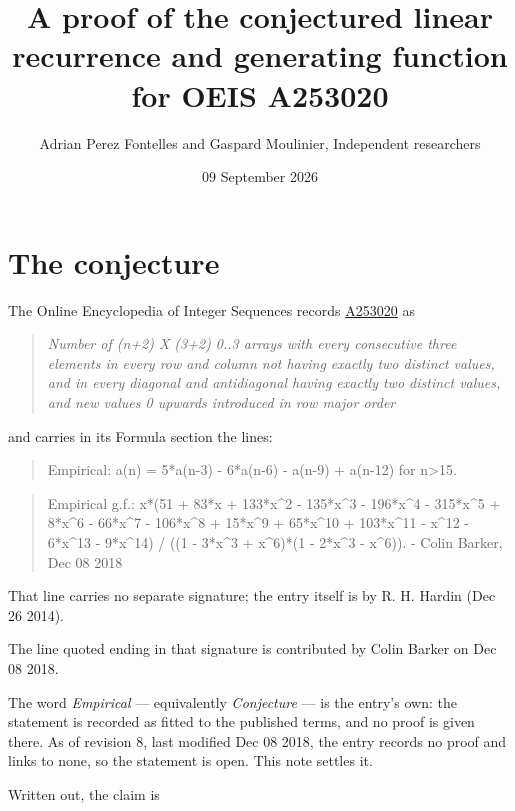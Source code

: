 \documentclass[11pt]{article}
\title{A proof of the conjectured linear recurrence and generating function for OEIS A253020}
\author{Adrian Perez Fontelles and Gaspard Moulinier, Independent researchers}
\date{09 September 2026}
\theoremstyle{definition}
\begin{document}
\maketitle
\section{The conjecture}

The Online Encyclopedia of Integer Sequences records \href{https://oeis.org/A253020}{A253020} as

\begin{quote}\itshape Number of (n+2) X (3+2) 0..3 arrays with every consecutive three elements in every row and column not having exactly two distinct values, and in every diagonal and antidiagonal having exactly two distinct values, and new values 0 upwards introduced in row major order\end{quote}

and carries in its Formula section the lines:

\begin{quote}\ttfamily Empirical: a(n) = 5*a(n-3) - 6*a(n-6) - a(n-9) + a(n-12) for n>15.\end{quote}

\begin{quote}\ttfamily Empirical g.f.: x*(51 + 83*x + 133*x\textasciicircum{}2 - 135*x\textasciicircum{}3 - 196*x\textasciicircum{}4 - 315*x\textasciicircum{}5 + 8*x\textasciicircum{}6 - 66*x\textasciicircum{}7 - 106*x\textasciicircum{}8 + 15*x\textasciicircum{}9 + 65*x\textasciicircum{}10 + 103*x\textasciicircum{}11 - x\textasciicircum{}12 - 6*x\textasciicircum{}13 - 9*x\textasciicircum{}14) / ((1 - 3*x\textasciicircum{}3 + x\textasciicircum{}6)*(1 - 2*x\textasciicircum{}3 - x\textasciicircum{}6)). - Colin Barker, Dec 08 2018\end{quote}

That line carries no separate signature; the entry itself is by R. H. Hardin (Dec 26 2014).

The line quoted ending in that signature is contributed by Colin Barker on Dec 08 2018.

The word {\itshape Empirical} --- equivalently {\itshape Conjecture} --- is the entry's own: the statement is recorded as fitted to the published terms, and no proof is given there. As of revision 8, last modified Dec 08 2018, the entry records no proof and links to none, so the statement is open. This note settles it.

Written out, the claim is
\end{document}
